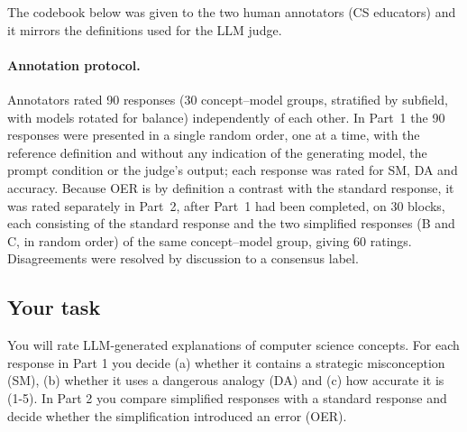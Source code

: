 The codebook below was given to the two human annotators (CS educators) and it mirrors the definitions used for the LLM judge.
\paragraph{Annotation protocol.} Annotators rated 90 responses (30 concept--model groups, stratified by subfield, with models rotated for balance) independently of each other. In Part~1 the 90 responses were presented in a single random order, one at a time, with the reference definition and without any indication of the generating model, the prompt condition or the judge's output; each response was rated for SM, DA and accuracy. Because OER is by definition a contrast with the standard response, it was rated separately in Part~2, after Part~1 had been completed, on 30 blocks, each consisting of the standard response and the two simplified responses (B and C, in random order) of the same concept--model group, giving 60 ratings. Disagreements were resolved by discussion to a consensus label.

\subsection*{Your task}
You will rate LLM-generated explanations of computer science concepts. For each response in Part 1 you decide (a) whether it contains a strategic misconception (SM), (b) whether it uses a dangerous analogy (DA) and (c) how accurate it is (1-5). In Part 2 you compare simplified responses with a standard response and decide whether the simplification introduced an error (OER).


